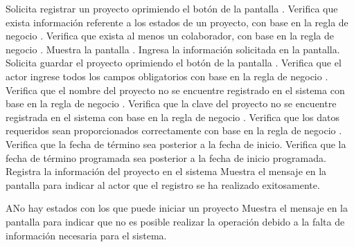 	\begin{UCtrayectoria}
		\UCpaso[\UCactor] Solicita registrar un proyecto oprimiendo el botón  de la pantalla .
		\UCpaso[\UCsist] Verifica que exista información referente a los estados de un proyecto, con base en la regla de negocio . 
		\UCpaso[\UCsist] Verifica que exista al menos un colaborador, con base en la regla de negocio . 
		\UCpaso[\UCsist] Muestra la pantalla .
		\UCpaso[\UCactor] Ingresa la información solicitada en la pantalla. \label{CU2.1-P5}
		\UCpaso[\UCactor] Solicita guardar el proyecto oprimiendo el botón  de la pantalla . 
		\UCpaso[\UCsist] Verifica que el actor ingrese todos los campos obligatorios con base en la regla de negocio . 
		\UCpaso[\UCsist] Verifica que el nombre del proyecto no se encuentre registrado en el sistema con base en la regla de negocio . 
		\UCpaso[\UCsist] Verifica que la clave del proyecto no se encuentre registrada en el sistema con base en la regla de negocio . 
		\UCpaso[\UCsist] Verifica que los datos requeridos sean proporcionados correctamente con base en la regla de negocio .  
		\UCpaso[\UCsist] Verifica que la fecha de término sea posterior a la fecha de inicio. 
		\UCpaso[\UCsist] Verifica que la fecha de término programada sea posterior a la fecha de inicio programada. 
		\UCpaso[\UCsist] Registra la información del proyecto en el sistema
		\UCpaso[\UCsist] Muestra el mensaje  en la pantalla  para indicar al actor que el registro se ha realizado exitosamente.
	\end{UCtrayectoria}		
		\begin{UCtrayectoriaA}{A}{No hay estados con los que puede iniciar un proyecto}
			\UCpaso[\UCsist] Muestra el mensaje  en la pantalla  para indicar que no es posible realizar la operación debido a la falta de información necesaria para el sistema.
		\end{UCtrayectoriaA}

